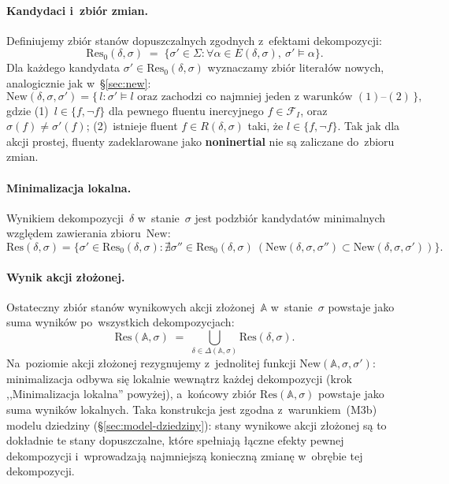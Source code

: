 \documentclass[11pt,a4paper]{article}
\newcommand{\noninertial}{\textbf{noninertial}}
\theoremstyle{definition}
\begin{document}
\paragraph{Kandydaci i~zbiór zmian.}
Definiujemy zbiór stanów dopuszczalnych zgodnych z~efektami
dekompozycji:
\[
  \mathrm{Res}_0(\delta,\sigma)
    \;=\; \{\sigma' \in \Sigma :
      \forall \alpha \in E(\delta,\sigma),\ \sigma' \models \alpha\}.
\]
Dla każdego kandydata $\sigma' \in \mathrm{Res}_0(\delta,\sigma)$
wyznaczamy zbiór literałów nowych, analogicznie jak w~§\ref{sec:new}:
\[
  \mathrm{New}(\delta,\sigma,\sigma')
    = \{\, l : \sigma' \models l \text{ oraz zachodzi co najmniej jeden
      z~warunków } (1)\text{--}(2)\,\},
\]
gdzie (1)~$l \in \{f, \neg f\}$ dla pewnego fluentu inercyjnego
$f \in \mathcal{F}_I$, oraz $\sigma(f)\neq\sigma'(f)$;
(2)~istnieje fluent $f \in R(\delta,\sigma)$ taki, że $l \in \{f, \neg f\}$.
Tak jak dla akcji prostej, fluenty zadeklarowane jako \noninertial{}
nie są zaliczane do~zbioru zmian.

\paragraph{Minimalizacja lokalna.}
Wynikiem dekompozycji~$\delta$ w~stanie~$\sigma$ jest podzbiór
kandydatów minimalnych względem zawierania zbioru~$\mathrm{New}$:
\[
  \mathrm{Res}(\delta,\sigma)
  = \{\sigma' \in \mathrm{Res}_0(\delta,\sigma) :
    \nexists \sigma'' \in \mathrm{Res}_0(\delta,\sigma)\
    (\mathrm{New}(\delta,\sigma,\sigma'') \subset
     \mathrm{New}(\delta,\sigma,\sigma'))\}.
\]

\paragraph{Wynik akcji złożonej.}
Ostateczny zbiór stanów wynikowych akcji złożonej~$\mathbb{A}$
w~stanie~$\sigma$ powstaje jako suma wyników po~wszystkich dekompozycjach:
\begin{equation}
  \label{eq:res-zlozone}
  \mathrm{Res}(\mathbb{A},\sigma)
  \;=\; \bigcup_{\delta \in \Delta(\mathbb{A},\sigma)}
        \mathrm{Res}(\delta,\sigma).
\end{equation}
Na~poziomie akcji złożonej rezygnujemy z~jednolitej funkcji $\mathrm{New}(\mathbb{A},\sigma,\sigma')$: minimalizacja odbywa się lokalnie wewnątrz każdej dekompozycji (krok ,,Minimalizacja lokalna'' powyżej), a~końcowy zbiór $\mathrm{Res}(\mathbb{A},\sigma)$ powstaje jako suma wyników lokalnych. Taka konstrukcja jest zgodna z~warunkiem~(M3b) modelu dziedziny (§\ref{sec:model-dziedziny}): stany wynikowe akcji złożonej są to dokładnie te stany dopuszczalne, które spełniają łączne efekty pewnej dekompozycji i~wprowadzają najmniejszą konieczną zmianę w~obrębie tej dekompozycji.
\end{document}
